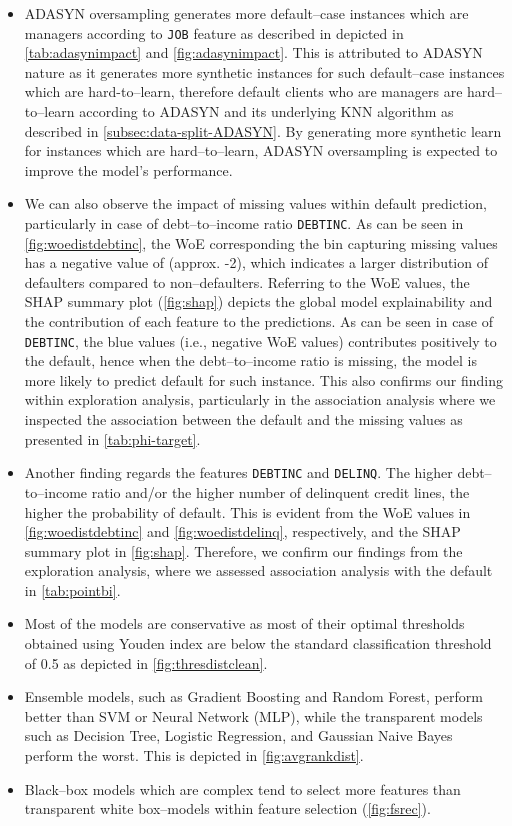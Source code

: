 \begin{itemize}\setlength\itemsep{0em}
    \item ADASYN oversampling generates more default--case instances which are managers according to \texttt{JOB} feature as described in depicted in \autoref{tab:adasynimpact} and \autoref{fig:adasynimpact}.
    This is attributed to ADASYN nature as it generates more synthetic instances for such default--case instances which are hard-to--learn, therefore default clients who are managers are hard--to--learn according to ADASYN and its underlying KNN algorithm as described in \autoref{subsec:data-split-ADASYN}. By generating more synthetic learn for instances which are hard--to--learn, ADASYN oversampling is expected to improve the model's performance.
    \item We can also observe the impact of missing values within default prediction, particularly in case of debt--to--income ratio \texttt{DEBTINC}. As can be seen in \autoref{fig:woedistdebtinc}, the WoE corresponding the bin capturing missing values has a negative value of (approx. -2), which indicates a larger distribution of defaulters compared to non--defaulters.
    Referring to the WoE values, the SHAP summary plot (\autoref{fig:shap}) depicts the global model explainability and the contribution of each feature to the predictions. As can be seen in case of \texttt{DEBTINC}, the blue values (i.e., negative WoE values) contributes positively to the default, hence when the debt--to--income ratio is missing, the model is more likely to predict default for such instance.
    This also confirms our finding within exploration analysis, particularly in the association analysis where we inspected the association between the default and the missing values as presented in \autoref{tab:phi-target}.
    \item Another finding regards the features \texttt{DEBTINC} and \texttt{DELINQ}. The higher debt--to--income ratio and/or the higher number of delinquent credit lines, the higher the probability of default. This is evident from the WoE values in \autoref{fig:woedistdebtinc} and \autoref{fig:woedistdelinq}, respectively, and the SHAP summary plot in \autoref{fig:shap}.
    Therefore, we confirm our findings from the exploration analysis, where we assessed association analysis with the default in \autoref{tab:pointbi}.
    \item Most of the models are conservative as most of their optimal thresholds obtained using Youden index are below the standard classification threshold of 0.5 as depicted in \autoref{fig:thresdistclean}.
    \item Ensemble models, such as Gradient Boosting and Random Forest, perform better than SVM or Neural Network (MLP), while the transparent models such as Decision Tree, Logistic Regression, and Gaussian Naive Bayes perform the worst. This is depicted in \autoref{fig:avgrankdist}.
    \item Black--box models which are complex tend to select more features than transparent white box--models within feature selection (\autoref{fig:fsrec}).
\end{itemize}

